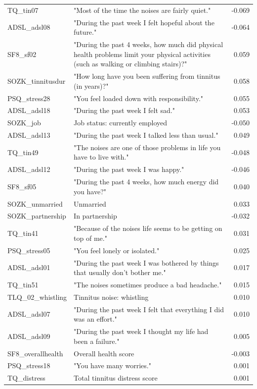 \documentclass[
  oneside]{book}
\begin{document}
\begin{table}
\begin{tabular}[t]{l>{\raggedright\arraybackslash}p{10cm}r}
TQ\_tin07 & "Most of the time the noises are fairly quiet." & -0.069\\
ADSL\_adsl08 & "During the past week I felt hopeful about the future." & -0.064\\
SF8\_sf02 & "During the past 4 weeks, how much did physical health problems limit your physical activities (such as walking or climbing stairs)?" & 0.059\\
SOZK\_tinnitusdur & "How long have you been suffering from tinnitus (in years)?" & 0.058\\
PSQ\_stress28 & "You feel loaded down with responsibility." & 0.055\\
ADSL\_adsl18 & "During the past week I felt sad." & 0.053\\
SOZK\_job & Job status: currently employed & -0.050\\
ADSL\_adsl13 & "During the past week I talked less than usual." & 0.049\\
TQ\_tin49 & "The noises are one of those problems in life you have to live with." & -0.048\\
ADSL\_adsl12 & "During the past week I was happy." & -0.046\\
SF8\_sf05 & "During the past 4 weeks, how much energy did you have?" & 0.040\\
SOZK\_unmarried & Unmarried & 0.033\\
SOZK\_partnership & In partnership & -0.032\\
TQ\_tin41 & "Because of the noises life seems to be getting on top of me." & 0.031\\
PSQ\_stress05 & "You feel lonely or isolated." & 0.025\\
ADSL\_adsl01 & "During the past week I was bothered by things that usually don't bother me." & 0.017\\
TQ\_tin51 & "The noises sometimes produce a bad headache." & 0.015\\
TLQ\_02\_whistling & Tinnitus noise: whistling & 0.010\\
ADSL\_adsl07 & "During the past week I felt that everything I did was an effort." & 0.010\\
ADSL\_adsl09 & "During the past week I thought my life had been a failure." & 0.005\\
SF8\_overallhealth & Overall health score & -0.003\\
PSQ\_stress18 & "You have many worries." & 0.001\\
TQ\_distress & Total tinnitus distress score & 0.001\\
\bottomrule
\end{tabular}
\end{table}
\end{document}
